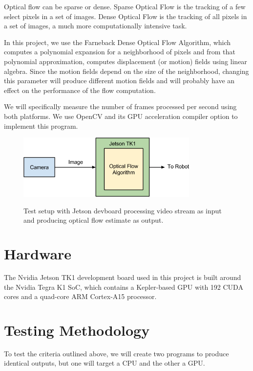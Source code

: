 \documentclass[12pt,letterpaper]{article}
\begin{document}
Optical flow can be sparse or dense. Sparse Optical Flow is the tracking of
a few select pixels in a set of images. Dense Optical Flow is the tracking of
all pixels in a set of images, a much more computationally intensive task.

In this project, we use the Farneback Dense Optical Flow Algorithm, which
computes a polynomial expansion for a neighborhood of pixels and from that
polynomial approximation, computes displacement (or motion) fields using linear
algebra. Since the motion fields depend on the size of the neighborhood,
changing this parameter will produce different motion fields and will probably
have an effect on the performance of the flow computation.

We will specifically measure the number of frames processed per second using
both platforms. We use OpenCV and its GPU acceleration compiler option to 
implement this program.

\begin{figure}[H]
  \centering
  \includegraphics[width=0.8\textwidth]{sys.png}
  \label{fig:sys}
  \caption{Test setup with Jetson devboard processing video stream as input and producing optical flow estimate as output.}
\end{figure}

\section{Hardware}
The Nvidia Jetson TK1 development board used in this project is built around
the Nvidia Tegra K1 SoC, which contains a Kepler-based GPU with 192 CUDA cores
and a quad-core ARM Cortex-A15 processor.

\section{Testing Methodology}
To test the criteria outlined above, we will create two programs to produce
identical outputs, but one will target a CPU and the other a GPU.
\end{document}
